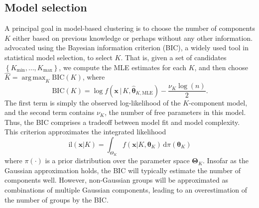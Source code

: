 \documentclass{uwstat572}
\newcommand*\set[1]{\left\{#1\right\}}
\newcommand*\estim[1]{\widehat{#1}}
\newcommand*\der{\text{d}}
\newcommand*\bx{\mathbf{x}}
\newcommand*\btheta{\boldsymbol{\theta}}
\newcommand*\bTheta{\boldsymbol{\Theta}}
\DeclareMathOperator*{\argmax}{arg\;max}
\renewcommand\;{\,}
\begin{document}
\subsection{Model selection}
A principal goal in model-based clustering is to choose the number of components $K$ either based on previous knowledge or perhaps without any other information.
\citet{Dasgupta98} advocated using the Bayesian information criterion (BIC), a widely used tool in statistical model selection, to select $K$. 
That is, given a set of candidates $\set{K_\text{min}, \dotsc, K_\text{max}}$, we compute the MLE estimates for each $K$, and then choose $\estim K = \argmax_K \text{BIC}(K)$, where
\begin{equation}\label{BIC}
\text{BIC}(K) 
	= \log f \left(\bx \;\big|\; K, \estim\btheta_{K, \text{MLE}}\right)
		- \frac{ \nu_K \log(n) }{2}.
\end{equation}
The first term is simply the observed log-likelihood of the $K$-component model, and the second term contains $\nu_K$, the number of free parameters in this model.
Thus, the BIC comprises a tradeoff between model fit and model complexity.
This criterion approximates the integrated likelihood
\begin{equation}\label{IL}
\text{il}(\bx | K)
	 = \int_{\Theta_K} f(\bx | K, \btheta_K) \; \der \pi(\btheta_K)
\end{equation}
where $\pi(\cdot)$ is a prior distribution over the parameter space $\bTheta_K$.
Insofar as the Gaussian approximation holds, the BIC will typically estimate the number of components well.
However, non-Gaussian groups will be approximated as combinations of multiple Gaussian components, leading to an overestimation of the number of groups by the BIC. 
\end{document}
